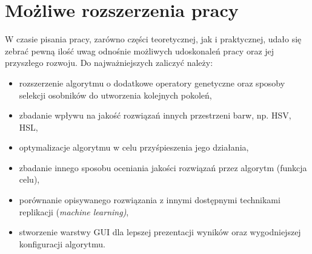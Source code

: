 \section{Możliwe rozszerzenia pracy}
W czasie pisania pracy, zarówno części teoretycznej, jak i praktycznej, udało się zebrać pewną ilość uwag odnośnie możliwych udoskonaleń pracy oraz jej przyszłego rozwoju. Do najważniejszych zaliczyć należy:
\begin{itemize}
    \item rozszerzenie algorytmu o dodatkowe operatory genetyczne oraz sposoby selekcji osobników do utworzenia kolejnych pokoleń,
    \item zbadanie wpływu na jakość rozwiązań innych przestrzeni barw, np. HSV, HSL,
    \item optymalizacje algorytmu w celu przyśpieszenia jego działania,
    \item zbadanie innego sposobu oceniania jakości rozwiązań przez algorytm (funkcja celu),
    \item porównanie opisywanego rozwiązania z innymi dostępnymi technikami replikacji (\textit{machine learning)},
    \item stworzenie warstwy GUI dla lepszej prezentacji wyników oraz wygodniejszej konfiguracji algorytmu.
\end{itemize}
